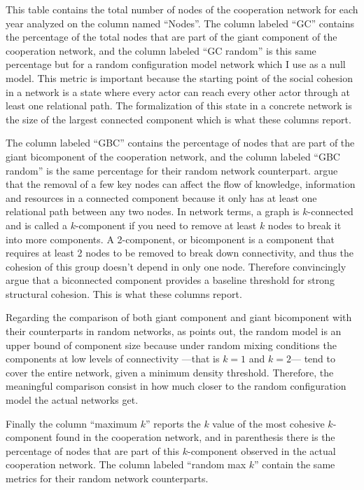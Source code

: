 

This table contains the total number of nodes of the cooperation network for each year analyzed on the column named ``Nodes''. The column labeled ``GC'' contains the percentage of the total nodes that are part of the giant component of the cooperation network, and the column labeled ``GC random'' is this same percentage but for a random configuration model network which I use as a null model. This metric is important because the starting point of the social cohesion in a network is a state where every actor can reach every other actor through at least one relational path. The formalization of this state in a concrete network is the size of the largest connected component which is what these columns report. 

The column labeled ``GBC'' contains the percentage of nodes that are part of the giant bicomponent of the cooperation network, and the column labeled ``GBC random'' is the same percentage for their random network counterpart. \citet{moody:2003} argue that the removal of a few key nodes can affect the flow of knowledge, information and resources in a connected component because it only has at least one relational path between any two nodes. In network terms, a graph is $k$-connected and is called a $k$-component if you need to remove at least $k$ nodes to break it into more components. A 2-component, or bicomponent is a component that requires at least 2 nodes to be removed to break down connectivity, and thus the cohesion of this group doesn't depend in only one node. Therefore \citet{moody:2003} convincingly argue that a biconnected component provides a baseline threshold for strong structural cohesion. This is what these columns report.

Regarding the comparison of both giant component and giant bicomponent with their counterparts in random networks, as \citet[229-230]{moody:2004} points out, the random model is an upper bound of component size because under random mixing conditions the components at low levels of connectivity ---that is $k = 1$ and $k = 2$--- tend to cover the entire network, given a minimum density threshold. Therefore, the meaningful comparison consist in how much closer to the random configuration model the actual networks get.

Finally the column ``maximum $k$'' reports the $k$ value of the most cohesive $k$-component found in the cooperation network, and in parenthesis there is the percentage of nodes that are part of this $k$-component observed in the actual cooperation network. The column labeled ``random max $k$'' contain the same metrics for their random network counterparts. 

